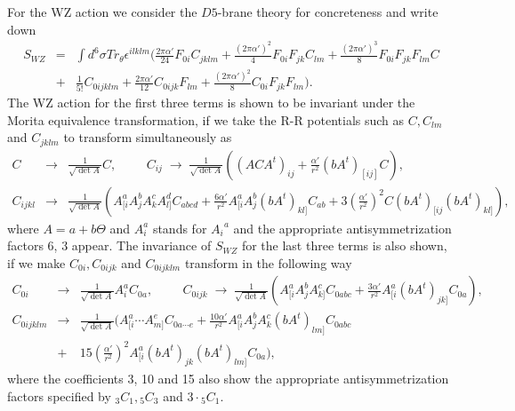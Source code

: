 \documentclass[12pt,a4paper]{article}
\newcommand{\al}{\alpha'}
\newcommand{\e}{\epsilon}
\newcommand{\te}{\theta}
\newcommand{\Te}{\Theta}
\begin{document}
For the WZ action we consider the $D5$-brane theory for concreteness and
write down
\begin{eqnarray}
S_{WZ} &=& \int d^6\sigma Tr_{\te}\e^{ilklm}(\frac{2\pi\al}{24}F_{0i}
C_{jklm} + \frac{(2\pi\al)^2}{4}F_{0i}F_{jk}C_{lm} + 
\frac{(2\pi\al)^3}{8}F_{0i}F_{jk}F_{lm}C \nonumber \\  
&+& \frac{1}{5!}C_{0ijklm}+ \frac{2\pi\al}{12}C_{0ijk}F_{lm} +  
\frac{(2\pi\al)^2}{8}C_{0i}F_{jk}F_{lm}).
\label{swz}\end{eqnarray}
The WZ action for the first three terms is shown to be invariant
under the Morita equivalence transformation, if we take the R-R 
potentials such as $C, C_{lm}$ and $C_{jklm}$ to transform 
simultaneously as
\begin{eqnarray}
C &\rightarrow& \frac{1}{\sqrt{\det A}}C, \hspace{1cm}
 C_{ij} \; \rightarrow  \; \frac{1}
{\sqrt{\det A}}((ACA^t)_{ij} + \frac{\al}{r^2}(bA^t)_{[ij]}C), 
\\  C_{ijkl} &\rightarrow& 
\frac{1}{\sqrt{\det A}}(A_{[i}^a A_j^b A_k^c A_{l]}^d
C_{abcd} + \frac{6\al}{r^2}A_{[i}^a A_j^b (bA^t)_{kl]}C_{ab} +
3(\frac{\al}{r^2})^2 C(bA^t)_{[ij}(bA^t)_{kl]} ), \nonumber
\end{eqnarray}
where $A = a + b\Te$ and $A_i^a$ stands for $A_i^{\:\:a}$ and the
 appropriate antisymmetrization factors 6, 3 appear.
The invariance of $S_{WZ}$ for the last three terms 
is also shown, if we make $C_{0i}, C_{0ijk}$ and $C_{0ijklm}$ transform
in the following way
\begin{eqnarray}
C_{0i} &\rightarrow&  \frac{1}{\sqrt{\det A}}A_i^a C_{0a}, \hspace{1cm}
C_{0ijk} \;\rightarrow \;\frac{1}{\sqrt{\det A}}(A_{[i}^aA_j^b A_{k]}^c
C_{0abc} + \frac{3\al}{r^2} A_{[i}^a(bA^t)_{jk]}C_{0a} ), \nonumber \\
C_{0ijklm} &\rightarrow& \frac{1}{\sqrt{\det A}}(A_{[i}^a \cdots A_{m]}^e
C_{0a\cdots e} + \frac{10\al}{r^2}A_{[i}^a A_j^b A_k^c (bA^t)_{lm]}
C_{0abc} \\  &+& 15(\frac{\al}{r^2})^2
A_{[i}^a(bA^t)_{jk}(bA^t)_{lm]}C_{0a} ), \nonumber
\end{eqnarray}
where the coefficients 3, 10 and 15 also show the appropriate 
antisymmetrization factors specified by ${}_3C_1, {}_5C_3$ and 
$3\cdot{}_5C_1$.
\end{document}
